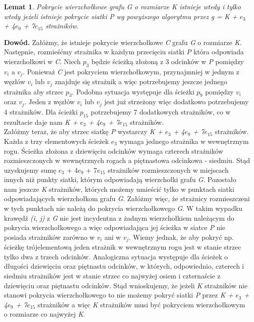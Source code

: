 \documentclass[brudnopis]{xmgr}
\newtheorem{Lemat}{Lemat}
\begin{document}
\begin{Lemat}
	Pokrycie wierzchołkowe grafu \textnormal{G} o rozmiarze \textnormal{K} istnieje wtedy i tylko wtedy jeżeli istnieje pokrycie siatki \textnormal{P} wg powyższego algorytmu przez \textnormal{g = K + $e_3$ + 4$e_9$ + 7$e_{15}$} strażników.
\end{Lemat}
\textbf{Dowód.} Załóżmy, że istnieje pokrycie wierzchołkowe \textit{C} grafu \textit{G} o rozmiarze \textit{K}. Następnie, rozmieśćmy strażnika w każdym przecięciu siatki \textit{P} która odpowiada wierzchołkowi w \textit{C}.
Niech $p_3$ będzie ścieżką złożoną z 3 odcinków w \textit{P} pomiędzy $v_i$ a $v_j$. Ponieważ \textit{C} jest pokryciem wierzchołkowym, przynajmniej w jednym z węzłów $v_i$ lub $v_j$ znajduje się strażnik a więc potrzebujemy jeszcze jednego strażnika aby strzec $p_3$. Podobna sytuacja występuje dla ścieżki $p_9$ pomiędzy $v_i$ oraz $v_j$. Jeden z węzłów $v_i$ lub $v_j$ jest już strzeżony więc dodatkowo potrzebujemy 4 strażników. Dla ścieżki $p_{15}$ potrzebujemy 7 dodatkowych strażników, co w rezultacie daje nam \textit{K + $e_3$ + 4$e_9$ + 7$e_{15}$} strażników.
\\\indent Załóżmy teraz, że aby strzec siatkę \textit{P} wystarczy \textit{K + $e_3$ + 4$e_9$ + 7$e_{15}$} strażników. Każda z trzy elementowych ścieżek $e_3$ wymaga jednego strażnika w wewnętrznym rogu. Ścieżka złożona z dziewięciu odcinków wymaga czterech strażników rozmieszczonych w wewnętrznych rogach a piętnastowa odcinkowa - siedmiu. Stąd uzyskujemy sumę $e_3$ + 4$e_9$ + 7$e_{15}$ strażników rozmieszczonych w miejscach innych niż punkty siatki, którym odpowiadają wierzchołki grafu \textit{G}. Pozostało nam jeszcze \textit{K} strażników, których możemy umieścić tylko w punktach siatki odpowiadających wierzchołkom grafu \textit{G}. Załóżmy więc, że strażnicy rozmieszczeni w tych punktach nie należą do pokrycia wierzchołkowego \textit{G}. W takim wypadku krawędź \textit{(i, j)} z \textit{G} nie jest incydentna z żadnym wierzchołkiem należącym do pokrycia wierzchołkowego a więc odpowiadająca jej ścieżka w siatce \textit{P} nie posiada strażników zarówno w $v_i$ ani w $v_j$. Wiemy jednak, że aby pokryć np. ścieżkę trójelementową jeden strażnik w wewnętrznym rogu jest w stanie strzec tylko dwa z trzech odcinków. Analogiczna sytuacja występuje dla ścieżek o długości dziewięciu oraz piętnastu odcinków, w których, odpowiednio, czterech i siedmiu strażników jest w stanie strzec co najwyżej osiem i czternaście z dziewięciu oraz piętnastu odcinków. Stąd wnioskujemy, że jeżeli \textit{K} strażników nie stanowi pokrycia wierzchołkowego to nie możemy pokryć siatki \textit{P} przez \textit{K + $e_3$ + 4$e_9$ + 7$e_{15}$} strażników a więc \textit{K} strażników musi być pokryciem wierzchołkowym o rozmiarze co najwyżej \textit{K}.
\end{document}
